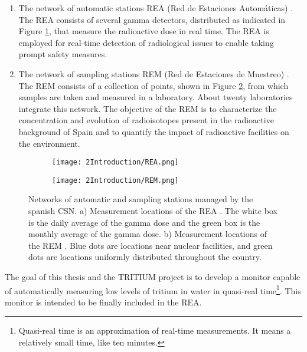 \begin{enumerate}
\begin{enumerate}
\item{} The network of automatic stations REA (Red de Estaciones Automáticas) \cite{REA}. The REA consists of several gamma detectors, distributed as indicated in Figure \ref{subfig:REA}, that measure the radioactive dose in real time. The REA is employed for real-time detection of radiological issues to enable taking prompt safety measures.

\item{} The network of sampling stations REM (Red de Estaciones de Muestreo) \cite{REM}. The REM consists of a collection of points, shown in Figure \ref{subfig:REM}, from which samples are taken and measured in a laboratory. About twenty laboratories integrate this network. The objective of the REM is to characterize the concentration and evolution of radioisotopes present in the radioactive background of Spain and to quantify the impact of radioactive facilities on the environment.
\end{enumerate}

\begin{figure}
\centering
    \begin{subfigure}[b]{0.7\textwidth}
    \centering
    \texttt{[image: 2Introduction/REA.png]}  
        \caption{}\label{subfig:REA}
    \end{subfigure}
    \hfill
    \begin{subfigure}[b]{0.7\textwidth}
    \centering
    \texttt{[image: 2Introduction/REM.png]}  
    \caption{\label{subfig:REM}}
    \end{subfigure}
 \caption{Networks of automatic and sampling stations managed by the spanish CSN. a) Measurement locations of the REA \cite{REA}. The white box is the daily average of the gamma dose and the green box is the monthly average of the gamma dose. b) Measurement locations of the REM \cite{REM}. Blue dots are locations near nuclear facilities, and green dots are locations uniformly distributed throughout the country.}
 \label{fig:NetworksCSN}
\end{figure}


\end{enumerate}

The goal of this thesis and the TRITIUM project is to develop a monitor capable of automatically measuring low levels of tritium in water in quasi-real time\footnote{Quasi-real time is an approximation of real-time measurements. It means a relatively small time, like ten minutes.}. This monitor is intended to be finally included in the REA.

